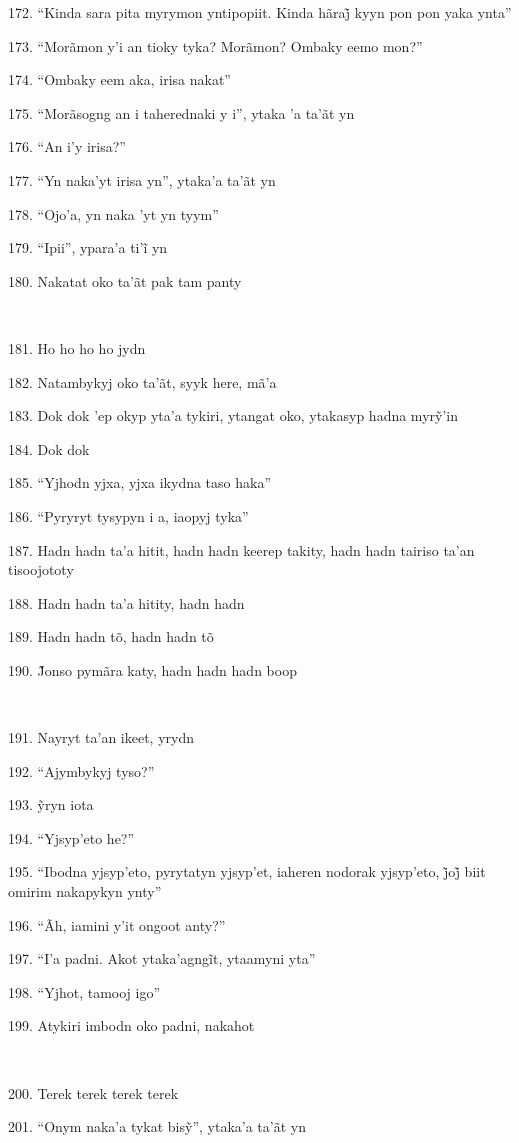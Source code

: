 172. ``Kinda sara pita myrymon yntipopiit. Kinda hãraj̃ kyyn pon pon yaka ynta''

173. ``Morãmon y'i an tioky tyka? Morãmon? Ombaky eemo mon?''

174. ``Ombaky eem aka, irisa nakat''

175. ``Morãsogng an i taherednaki y i'', ytaka 'a ta'ãt yn

176. ``An i'y irisa?''

177. ``Yn naka'yt irisa yn'', ytaka'a ta'ãt yn

178. ``Ojo'a, yn naka 'yt yn tyym''

179. ``Ipii'', ypara’a ti’ĩ yn

180. Nakatat oko ta'ãt pak tam panty

~

181. Ho ho ho ho jydn

182. Natambykyj oko ta'ãt, syyk here, mã'a

183. Dok dok ’ep okyp yta’a tykiri, ytangat oko, ytakasyp hadna myrỹ’in

184. Dok dok

185. ``Yjhodn yjxa, yjxa ikydna taso haka''

186. ``Pyryryt tysypyn i a, iaopyj tyka''

187. Hadn hadn ta'a hitit, hadn hadn keerep takity, hadn hadn tairiso
ta'an tisoojototy

188. Hadn hadn ta'a hitity, hadn hadn

189. Hadn hadn tõ, hadn hadn tõ

190. J̃onso pymãra katy, hadn hadn hadn boop

~

191. Nayryt ta'an ikeet, yrydn

192. ``Ajymbykyj tyso?''

193. ỹryn iota

194. ``Yjsyp'eto he?''

195. ``Ibodna yjsyp’eto, pyrytatyn yjsyp’et, iaheren nodorak yjsyp’eto, j̃oj̃ biit omirim nakapykyn ynty''

196. ``Ãh, iamini y'it ongoot anty?''

197. ``I’a padni. Akot ytaka’agngĩt, ytaamyni yta''

198. ``Yjhot, tamooj igo''

199. Atykiri imbodn oko padni, nakahot

~

200. Terek terek terek terek

201. ``Onym naka’a tykat bisỹ'', ytaka’a ta’ãt yn

